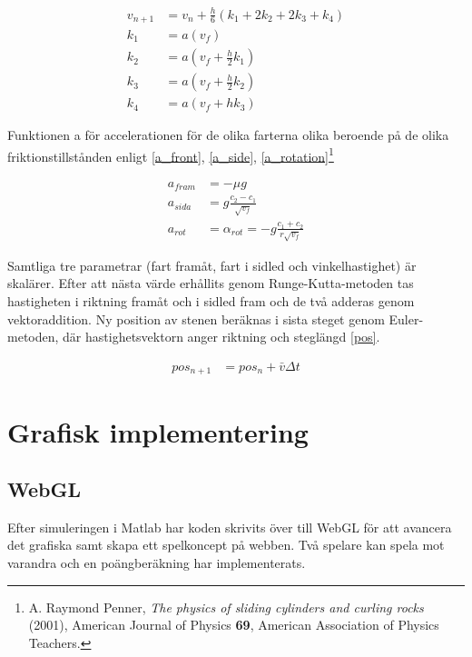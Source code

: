 \documentclass[11pt]{article} %
\begin{document}
 \begin{subequations}\label{impl}
 \begin{align}
 v_{n+1}& =v_n + \frac{h}{6} (k_1+2 k_2 + 2 k_3 + k_4)\\
 k_1& = a(v_f)\\
 k_2& = a(v_f + \frac{h}{2} k_1)\\
 k_3& = a(v_f + \frac{h}{2} k_2)\\
 k_4& = a(v_f + h k_3)
 \end{align}
\end{subequations}

Funktionen a för accelerationen för de olika farterna olika beroende på de olika friktionstillstånden enligt \eqref{a_front},  \eqref{a_side}, \eqref{a_rotation}\footnote{A. Raymond Penner, \emph{The physics of sliding cylinders and curling rocks} (2001), American Journal of Physics \textbf{69}, American Association of Physics Teachers.}
 
 \begin{align}\label{a_front}
 a_{fram}& = - \mu g\\\label{a_side}
 a_{sida}& = g \frac{c_2-c_1}{\sqrt{v_f}}\\\label{a_rotation}
 a_{rot}& = \alpha_{rot} = - g\frac{c_1+c_2}{r \sqrt{v_f}}
 \end{align}

Samtliga tre parametrar (fart framåt, fart i sidled och vinkelhastighet) är skalärer.
Efter att nästa värde erhållits genom Runge-Kutta-metoden tas hastigheten i riktning
framåt och i sidled fram och de två adderas genom vektoraddition. Ny position av stenen
beräknas i sista steget genom Euler-metoden, där hastighetsvektorn anger riktning och
steglängd \eqref{pos}. 

 \begin{align}\label{pos}
 pos_{n+1}& = pos_{n} + \bar{v} \Delta t
 \end{align}


\section{Grafisk implementering}

\subsection{WebGL}
Efter simuleringen i Matlab har koden skrivits över till WebGL för att avancera det grafiska samt skapa ett spelkoncept på webben. Två spelare kan spela mot varandra och en poängberäkning har implementerats. 
\end{document}
